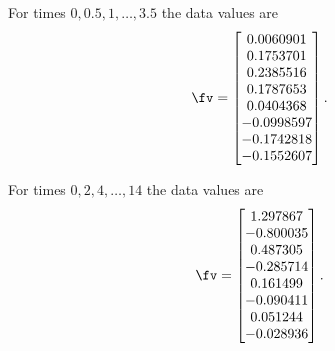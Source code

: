 \begin{exercise}
\begin{Parts}
\item  For times \(0,0.5,1,\ldots,3.5\) the data values are 
\setbox\ajrqrbox\hbox{}\marginajrbox%
\[ \fv=\begin{bmatrix} 0.0060901
\\  0.1753701
\\  0.2385516
\\  0.1787653
\\  0.0404368
\\ -0.0998597
\\ -0.1742818
\\ -0.1552607 \end{bmatrix}.\]
  
\item  For times \(0,2,4,\ldots,14\) the data values are 
\setbox\ajrqrbox\hbox{}\marginajrbox%
\[ \fv=\begin{bmatrix} 1.297867
\\ -0.800035
\\  0.487305
\\ -0.285714
\\  0.161499
\\ -0.090411
\\  0.051244
\\ -0.028936 \end{bmatrix}.\]
  
\end{Parts}
\end{exercise}




